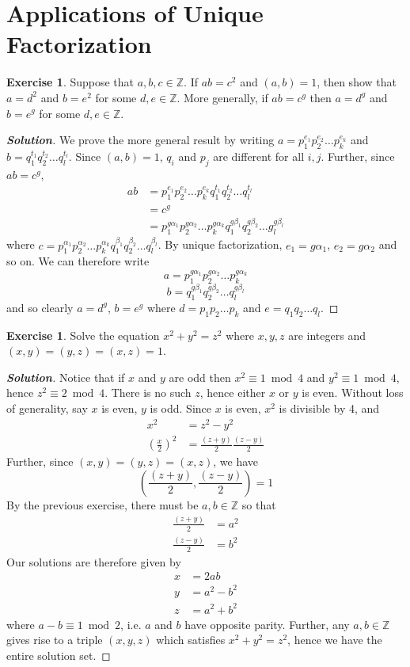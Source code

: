 \documentclass[12pt,leqno]{book}
\numberwithin{equation}{section}
\theoremstyle{definition}
\newtheorem{exer}[thm]{Exercise}
\newenvironment{Solution}{\begin{proof}[\textnormal{\textbf{Solution}}]}{\end{proof}}
\begin{document}
\section{Applications of Unique Factorization}
\begin{exer}
Suppose that $a,b,c\in\mathbb{Z}$. If $ab=c^2$ and $(a,b)=1$, then show that $a=d^2$ and $b=e^2$ for some $d,e\in\mathbb{Z}$. More generally, if $ab=c^g$ then $a=d^g$ and $b=e^g$ for some $d,e\in\mathbb{Z}$.
\end{exer}

\begin{Solution}
 We prove the more general result by writing $a=p_1^{e_1}p_2^{e_2}\hdots p_k^{e_k}$ and $b=q_1^{t_1}q_2^{t_2}\hdots q_l^{t_l}$. Since $(a,b)=1$, $q_i$ and $p_j$ are different for all $i,j$. Further, since $ab=c^g$, \begin{align*}ab&=p_1^{e_1}p_2^{e_2}\hdots p_k^{e_k}q_1^{t_1}q_2^{t_2}\hdots q_l^{t_l}\\&=c^g\\&=p_1^{g\alpha_1}p_2^{g\alpha_2}\hdots p_k^{g\alpha_k}q_1^{g\beta_1}q_2^{g\beta_2}\hdots g_l^{g\beta_l}\end{align*} where $c=p_1^{\alpha_1}p_2^{\alpha_2}\hdots p_k^{\alpha_k}q_1^{\beta_1}q_2^{\beta_2}\hdots q_l^{\beta_l}$. By unique factorization, $e_1=g\alpha_1$, $e_2=g\alpha_2$ and so on. We can therefore write \[a=p_1^{g\alpha_1}p_2^{g\alpha_2}\hdots p_k^{g\alpha_k}\]\[b=q_1^{g\beta_1}q_2^{g\beta_2}\hdots q_l^{g\beta_l}\] and so clearly $a=d^g$, $b=e^g$ where $d=p_1p_2\hdots p_k$ and $e=q_1q_2\hdots q_l$.
\end{Solution}

\begin{exer}
 Solve the equation $x^2+y^2=z^2$ where $x,y,z$ are integers and $(x,y)=(y,z)=(x,z)=1$. 
\end{exer}

\begin{Solution}
 Notice that if $x$ and $y$ are odd then $x^2\equiv1\bmod4$ and $y^2\equiv1\bmod4$, hence $z^2\equiv2\bmod4$. There is no such $z$, hence either $x$ or $y$ is even. Without loss of generality, say $x$ is even, $y$ is odd. Since $x$ is even, $x^2$ is divisible by 4, and \begin{align*}x^2&=z^2-y^2\\\left(\frac{x}{2}\right)^2&=\frac{(z+y)}{2}\frac{(z-y)}{2}\end{align*} Further, since $(x,y)=(y,z)=(x,z)$, we have \[\left(\frac{(z+y)}{2},\frac{(z-y)}{2}\right)=1\] By the previous exercise, there must be $a,b\in\mathbb{Z}$ so that \begin{align*}\frac{(z+y)}{2}&=a^2\\\frac{(z-y)}{2}&=b^2\end{align*} Our solutions are therefore given by \begin{align*}x&=2ab\\y&=a^2-b^2\\z&=a^2+b^2\end{align*} where $a-b\equiv1\bmod{2}$, i.e. $a$ and $b$ have opposite parity. Further, any $a,b\in\mathbb{Z}$ gives rise to a triple $(x,y,z)$ which satisfies $x^2+y^2=z^2$, hence we have the entire solution set.
\end{Solution}
\end{document}
